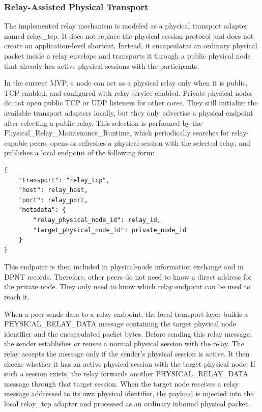 \documentclass[12pt]{article}
\newcommand{\codebreak}[1]{{\footnotesize\ttfamily #1}}
\begin{document}
\subsubsection{Relay-Assisted Physical Transport}
\label{subsec:relay-assisted-physical-transport}

The implemented relay mechanism is modeled as a physical transport adapter named \codebreak{relay\_\allowbreak{}tcp}. It does not replace the physical session protocol and does not create an application-level shortcut. Instead, it encapsulates an ordinary physical packet inside a relay envelope and transports it through a public physical node that already has active physical sessions with the participants.

In the current MVP, a node can act as a physical relay only when it is public, TCP-enabled, and configured with relay service enabled. Private physical nodes do not open public TCP or UDP listeners for other cores. They still initialize the available transport adapters locally, but they only advertise a physical endpoint after selecting a public relay. This selection is performed by the \codebreak{Physical\_\allowbreak{}Relay\_\allowbreak{}Maintenance\_\allowbreak{}Runtime}, which periodically searches for relay-capable peers, opens or refreshes a physical session with the selected relay, and publishes a local endpoint of the following form:

\begin{verbatim}
{
    "transport": "relay_tcp",
    "host": relay_host,
    "port": relay_port,
    "metadata": {
        "relay_physical_node_id": relay_id,
        "target_physical_node_id": private_node_id
    }
}
\end{verbatim}

This endpoint is then included in physical-node information exchange and in DPNT records. Therefore, other peers do not need to know a direct address for the private node. They only need to know which relay endpoint can be used to reach it.

When a peer sends data to a relay endpoint, the local transport layer builds a \codebreak{PHYSICAL\_\allowbreak{}RELAY\_\allowbreak{}DATA} message containing the target physical node identifier and the encapsulated packet bytes. Before sending this relay message, the sender establishes or reuses a normal physical session with the relay. The relay accepts the message only if the sender's physical session is active. It then checks whether it has an active physical session with the target physical node. If such a session exists, the relay forwards another \codebreak{PHYSICAL\_\allowbreak{}RELAY\_\allowbreak{}DATA} message through that target session. When the target node receives a relay message addressed to its own physical identifier, the payload is injected into the local \codebreak{relay\_\allowbreak{}tcp} adapter and processed as an ordinary inbound physical packet.
\end{document}
